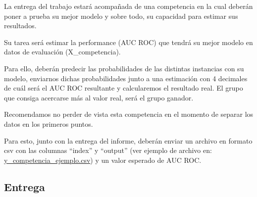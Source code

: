 \documentclass[11pt]{article}
\begin{document}
La entrega del trabajo estará acompañada de una competencia en la cual
deberán poner a prueba su mejor modelo y sobre todo, su capacidad para
estimar sus resultados.

Su tarea será estimar la performance (AUC ROC) que tendrá su mejor
modelo en datos de evaluación (X\_competencia).

Para ello, deberán predecir las probabilidades de las distintas
instancias con su modelo, enviarnos dichas probabilidades junto a una
estimación con 4 decimales de cuál será el AUC ROC resultante y
calcularemos el resultado real. El grupo que consiga acercarse más al
valor real, será el grupo ganador.

Recomendamos no perder de vista esta competencia en el momento de
separar los datos en los primeros puntos.

Para esto, junto con la entrega del informe, deberán enviar un archivo
en formato csv con las columnas ``index'' y ``output'' (ver ejemplo de
archivo en:
\href{https://github.com/pbrusco/aa-notebooks/blob/master/TP1/y_competencia_ejemplo.csv}{y\_competencia\_ejemplo.csv})
y un valor esperado de AUC ROC.

\subsection{Entrega}\label{entrega}
\end{document}
